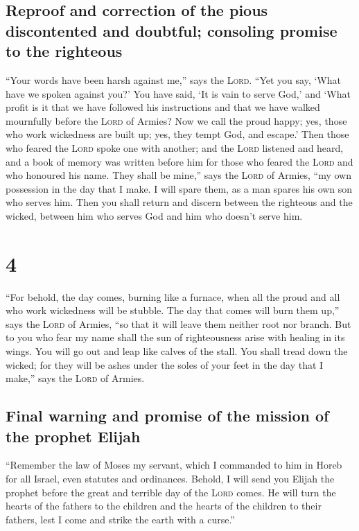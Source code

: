 \hypertarget{reproof-and-correction-of-the-pious-discontented-and-doubtful-consoling-promise-to-the-righteous}{%
\subsection{Reproof and correction of the pious discontented and
doubtful; consoling promise to the
righteous}\label{reproof-and-correction-of-the-pious-discontented-and-doubtful-consoling-promise-to-the-righteous}}

 ``Your words have been harsh against me,'' says the
\textsc{Lord}. ``Yet you say, `What have we spoken against you?'
 You have said, `It is vain to serve God,' and `What
profit is it that we have followed his instructions and that we have
walked mournfully before the \textsc{Lord} of Armies? 
Now we call the proud happy; yes, those who work wickedness are built
up; yes, they tempt God, and escape.'  Then those who
feared the \textsc{Lord} spoke one with another; and the \textsc{Lord}
listened and heard, and a book of memory was written before him for
those who feared the \textsc{Lord} and who honoured his name.
 They shall be mine,'' says the \textsc{Lord} of Armies,
``my own possession in the day that I make. I will spare them, as a man
spares his own son who serves him.  Then you shall return
and discern between the righteous and the wicked, between him who serves
God and him who doesn't serve him.

\hypertarget{section-3}{%
\section{4}\label{section-3}}

 ``For behold, the day comes, burning like a furnace, when
all the proud and all who work wickedness will be stubble. The day that
comes will burn them up,'' says the \textsc{Lord} of Armies, ``so that
it will leave them neither root nor branch.  But to you
who fear my name shall the sun of righteousness arise with healing in
its wings. You will go out and leap like calves of the stall.
 You shall tread down the wicked; for they will be ashes
under the soles of your feet in the day that I make,'' says the
\textsc{Lord} of Armies.

\hypertarget{final-warning-and-promise-of-the-mission-of-the-prophet-elijah}{%
\subsection{Final warning and promise of the mission of the prophet
Elijah}\label{final-warning-and-promise-of-the-mission-of-the-prophet-elijah}}

 ``Remember the law of Moses my servant, which I commanded
to him in Horeb for all Israel, even statutes and ordinances.
 Behold, I will send you Elijah the prophet before the
great and terrible day of the \textsc{Lord} comes.  He
will turn the hearts of the fathers to the children and the hearts of
the children to their fathers, lest I come and strike the earth with a
curse.''
